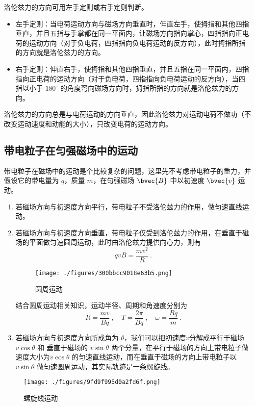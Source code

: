 洛伦兹力的方向可用左手定则或右手定则判断。

\begin{itemize}
\item 左手定则：当电荷运动方向与磁场方向垂直时，伸直左手，使拇指和其他四指垂直，并且五指与手掌都在同一平面内，让磁场方向指向掌心，四指指向正电荷的运动方向（对于负电荷，四指指向负电荷运动的反方向），此时拇指所指的方向就是洛伦兹力的方向。
\item 右手定则：伸直右手，使拇指和其他四指垂直，并且五指在同一平面内，四指指向正电荷的运动方向（对于负电荷，四指指向负电荷运动的反方向），当四指以小于 $180^\circ$ 的角度弯向磁场方向时，拇指所指的方向就是洛伦兹力的方向。
\end{itemize}

洛伦兹力的方向总是与电荷运动的方向垂直，因此洛伦兹力对运动电荷不做功（不改变运动速度和动能的大小），只改变电荷的运动方向。

\subsection{带电粒子在匀强磁场中的运动}


带电粒子在磁场中的运动是个比较复杂的问题，这里先不考虑带电粒子的重力，并假设它的带电量为 $q$，质量 $m$，在匀强磁场 $\bvec{B}$ 中以初速度 $\bvec{v}$ 运动。

\begin{enumerate}
\item 若磁场方向与初速度方向平行，带电粒子不受洛伦兹力的作用，做匀速直线运动。

\item 若磁场方向与初速度方向垂直，带电粒子仅受到洛伦兹力的作用，在垂直于磁场的平面做匀速圆周运动，此时由洛伦兹力提供向心力，则有
\begin{equation}
qvB=\frac{mv^2}{R}~.
\end{equation}

\begin{figure}[ht]
\centering
\texttt{[image: ./figures/300bbcc9018e63b5.png]}
\caption{圆周运动} \label{fig_HSPE06_2}
\end{figure}

结合圆周运动相关知识，运动半径、周期和角速度分别为
\begin{equation}
R=\frac{mv}{Bq}~, \quad T=\frac{2\pi}{Bq}~, \quad \omega=\frac{Bq}{m}~.
\end{equation}

\item 若磁场方向与初速度方向所成角为 $\theta$，我们可以把初速度$v$分解成平行于磁场 $v \cos \theta$ 和 垂直于磁场的 $v \sin \theta$ 两个分量，在平行于磁场的方向上带电粒子做速度大小为$v \cos \theta$ 的匀速直线运动，而在垂直于磁场的方向上带电粒子以 $v \sin \theta$ 做匀速圆周运动，其实际轨迹是一条螺旋线。
\end{enumerate}

\begin{figure}[ht]
\centering
\texttt{[image: ./figures/9fd9f995d0a2fd6f.png]}
\caption{螺旋线运动} \label{fig_HSPE06_3}
\end{figure}
